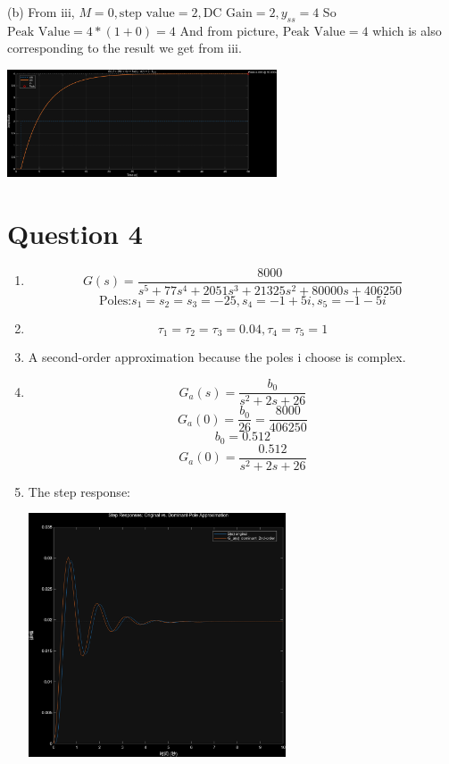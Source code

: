 \documentclass[12pt]{article}
\begin{document}
\begin{enumerate}[label=\roman*.]
        (b) From iii, $M = 0, \text{step value} = 2, \text{DC Gain}
        =2, y_{ss} = 4$
        So $\text{Peak Value} = 4 * (1+0) = 4$
        And from picture, $\text{Peak Value} = 4$ which is also corresponding to
        the result we get from iii.
        \begin{center}
            \includegraphics[width=0.6\textwidth]{Q3b.png}
        \end{center}

    \end{enumerate}

\section*{Question 4}
    \begin{enumerate}[label=\alph*]
        \item \[G(s) = \frac{8000}{s^5 + 77s^4 +2051s^3 + 21325s^2 + 80000s +
            406250}\]
        \[\text{Poles:} s_1 = s_2 = s_3 = -25, s_4 = -1+5i, s_5 = -1-5i\]

        \item \[\tau_1 = \tau_2 = \tau_3 = 0.04, \tau_4 = \tau_5 = 1\]
        
        \item A second-order approximation because the poles i choose is 
            complex.

        \item \[G_a(s) = \frac{b_0}{s^2+2s+26}\]
        \[G_a(0) = \frac{b_0}{26} = \frac{8000}{406250}\]
        \[b_0 = 0.512\]
        \[G_a(0) = \frac{0.512}{s^2+2s+26}\]

        \item The step response:
        \begin{center}
            \includegraphics[width=0.6\textwidth]{Q4.png}
        \end{center}

    \end{enumerate}
\end{document}
